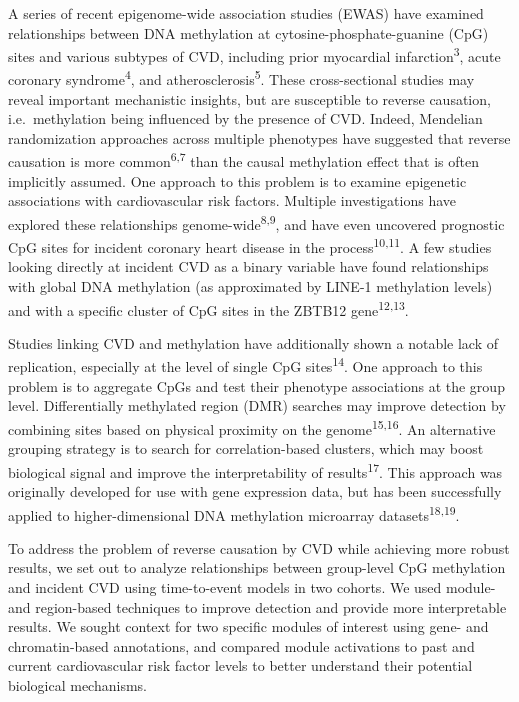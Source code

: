\documentclass[]{article}
\theoremstyle{definition}
\theoremstyle{definition}
\theoremstyle{definition}
\theoremstyle{remark}
\begin{document}
A series of recent epigenome-wide association studies (EWAS) have
examined relationships between DNA methylation at
cytosine-phosphate-guanine (CpG) sites and various subtypes of CVD,
including prior myocardial infarction\textsuperscript{3}, acute coronary
syndrome\textsuperscript{4}, and atherosclerosis\textsuperscript{5}.
These cross-sectional studies may reveal important mechanistic insights,
but are susceptible to reverse causation, i.e.~methylation being
influenced by the presence of CVD. Indeed, Mendelian randomization
approaches across multiple phenotypes have suggested that reverse
causation is more common\textsuperscript{6,7} than the causal
methylation effect that is often implicitly assumed. One approach to
this problem is to examine epigenetic associations with cardiovascular
risk factors. Multiple investigations have explored these relationships
genome-wide\textsuperscript{8,9}, and have even uncovered prognostic CpG
sites for incident coronary heart disease in the
process\textsuperscript{10,11}. A few studies looking directly at
incident CVD as a binary variable have found relationships with global
DNA methylation (as approximated by LINE-1 methylation levels) and with
a specific cluster of CpG sites in the ZBTB12
gene\textsuperscript{12,13}.

Studies linking CVD and methylation have additionally shown a notable
lack of replication, especially at the level of single CpG
sites\textsuperscript{14}. One approach to this problem is to aggregate
CpGs and test their phenotype associations at the group level.
Differentially methylated region (DMR) searches may improve detection by
combining sites based on physical proximity on the
genome\textsuperscript{15,16}. An alternative grouping strategy is to
search for correlation-based clusters, which may boost biological signal
and improve the interpretability of results\textsuperscript{17}. This
approach was originally developed for use with gene expression data, but
has been successfully applied to higher-dimensional DNA methylation
microarray datasets\textsuperscript{18,19}.

To address the problem of reverse causation by CVD while achieving more
robust results, we set out to analyze relationships between group-level
CpG methylation and incident CVD using time-to-event models in two
cohorts. We used module- and region-based techniques to improve
detection and provide more interpretable results. We sought context for
two specific modules of interest using gene- and chromatin-based
annotations, and compared module activations to past and current
cardiovascular risk factor levels to better understand their potential
biological mechanisms.
\end{document}
